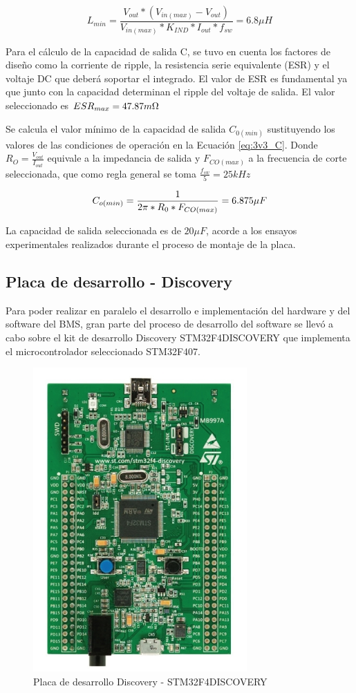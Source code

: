 \documentclass[10pt, a4paper]{report}
\begin{document}
\begin{equation}
    L_{min} = \frac{V_{out} * (V_{in (max)} - V_{out})}{V_{in (max)}*K_{IND}*I_{out}*f_{sw}} = 6.8\mu H
    \label{eq:3v3_L} 
\end{equation}

Para el cálculo de la capacidad de salida C, se tuvo en cuenta los factores de
diseño como la corriente de ripple, la resistencia serie equivalente
(\acrshort{ESR}) y el voltaje DC que deberá soportar el integrado. El valor de
\acrshort{ESR} es fundamental ya que junto con la capacidad determinan el ripple
del voltaje de salida. El valor seleccionado es $ESR_{max} = 47.87 m\ohm$

Se calcula el valor mínimo de la capacidad de salida $C_{0 (min)}$ sustituyendo
los valores de las condiciones de operación en la Ecuación \ref{eq:3v3_C}. Donde
$R_{O} = \frac{V_{out}}{I_{out}}$ equivale a la impedancia de salida y 
$F_{CO\left(max\right)}$ a la frecuencia de corte seleccionada, que como regla 
general se toma $\frac{f_{sw}}{5} = 25 kHz$ 

\begin{equation}
    C_{o (min)} = \frac{1}{2\pi * R_{0} * F_{CO (max)}} = 6.875\mu F\\
    \label{eq:3v3_C}
\end{equation}

La capacidad de salida seleccionada es de $20\mu F$, acorde a los
ensayos experimentales realizados durante el proceso de montaje de la placa. 

\subsection{Placa de desarrollo - Discovery}

Para poder realizar en paralelo el desarrollo e implementación del hardware y
del software del \acrshort{BMS}, gran parte del proceso de desarrollo del
software se llevó a cabo sobre el kit de desarrollo Discovery STM32F4DISCOVERY
que implementa el microcontrolador seleccionado STM32F407.

\begin{figure}[h!]
    \centering
    \includegraphics[width=0.3\linewidth, angle=90]{STM32F407VG-discovery.png}
    \caption{Placa de desarrollo Discovery - STM32F4DISCOVERY}
    \label{fig:stm32f4discovery}
\end{figure}
\end{document}

